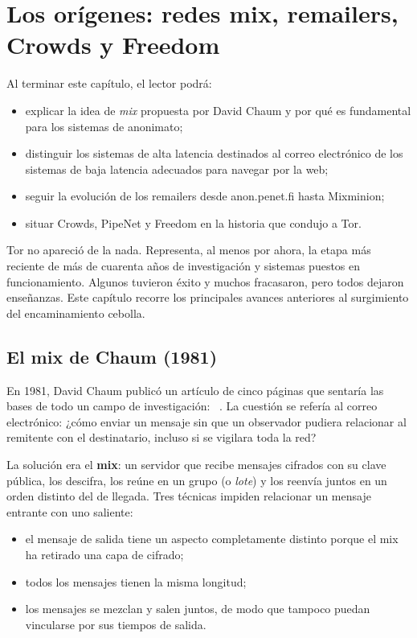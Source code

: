 \chapter{Los orígenes: redes mix, remailers, Crowds y Freedom}\label{cap:02-radici}

\begin{obiettivi}
Al terminar este capítulo, el lector podrá:
\begin{itemize}[nosep]
  \item explicar la idea de \emph{mix} propuesta por David Chaum y por qué es fundamental para los sistemas de anonimato;
  \item distinguir los sistemas de alta latencia destinados al correo electrónico de los sistemas de baja latencia adecuados para navegar por la web;
  \item seguir la evolución de los remailers desde anon.penet.fi hasta Mixminion;
  \item situar Crowds, PipeNet y Freedom en la historia que condujo a Tor.
\end{itemize}
\end{obiettivi}

Tor no apareció de la nada. Representa, al menos por ahora, la etapa más reciente de más de cuarenta años de investigación y sistemas puestos en funcionamiento. Algunos tuvieron éxito y muchos fracasaron, pero todos dejaron enseñanzas. Este capítulo recorre los principales avances anteriores al surgimiento del encaminamiento cebolla.

\section{El mix de Chaum (1981)}\label{sec:radici-chaum}

En 1981, David Chaum publicó un artículo de cinco páginas que sentaría las bases de todo un campo de investigación: ~\cite{chaum1981untraceable}. La cuestión se refería al correo electrónico: ¿cómo enviar un mensaje sin que un observador pudiera relacionar al remitente con el destinatario, incluso si se vigilara toda la red?

La solución era el \textbf{mix}: un servidor que recibe mensajes cifrados con su clave pública, los descifra, los reúne en un grupo (o \emph{lote}) y los reenvía juntos en un orden distinto del de llegada. Tres técnicas impiden relacionar un mensaje entrante con uno saliente:
\begin{itemize}
  \item el mensaje de salida tiene un aspecto completamente distinto porque el mix ha retirado una capa de cifrado;
  \item todos los mensajes tienen la misma longitud;
  \item los mensajes se mezclan y salen juntos, de modo que tampoco puedan vincularse por sus tiempos de salida.
\end{itemize}

